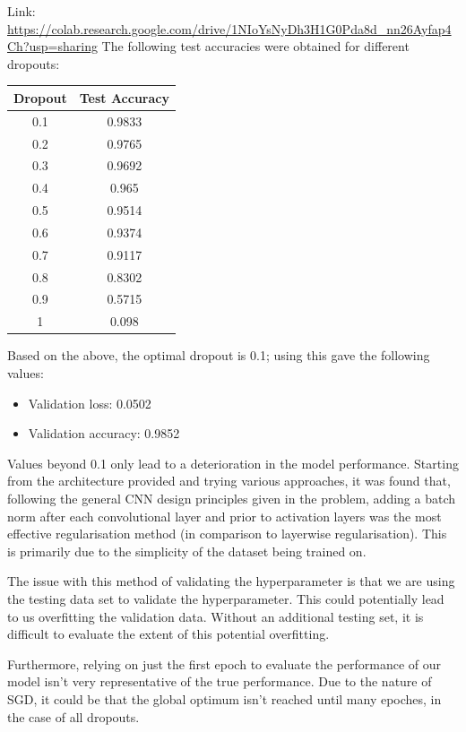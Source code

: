 \begin{solution}
  Link: \url{https://colab.research.google.com/drive/1NIoYsNyDh3H1G0Pda8d_nn26Ayfap4Ch?usp=sharing}
  The following test accuracies were obtained for different dropouts:

    \begin{center}
    \begin{tabular}{|c|c|}\hline
    Dropout & Test Accuracy \\\hline
    0.1     & 0.9833        \\
    0.2     & 0.9765        \\
    0.3     & 0.9692        \\
    0.4     & 0.965         \\
    0.5     & 0.9514        \\
    0.6     & 0.9374        \\
    0.7     & 0.9117        \\
    0.8     & 0.8302        \\
    0.9     & 0.5715        \\
    1       & 0.098        \\\hline
    \end{tabular}
  \end{center}
  Based on the above, the optimal dropout is 0.1; using this gave the following values:
  \begin{itemize}
    \item Validation loss: 0.0502
    \item Validation accuracy: 0.9852
  \end{itemize}
  Values beyond 0.1 only lead to a deterioration in the model performance. Starting from the architecture provided and trying various approaches, it was found that, following the general CNN design principles given in the problem, adding a batch norm after each convolutional layer and prior to activation layers was the most effective regularisation method (in comparison to layerwise regularisation). This is primarily due to the simplicity of the dataset being trained on.

  The issue with this method of validating the hyperparameter is that we are using the testing data set to validate the hyperparameter. This could potentially lead to us overfitting the validation data. Without an additional testing set, it is difficult to evaluate the extent of this potential overfitting. 

  Furthermore, relying on just the first epoch to evaluate the performance of our model isn't very representative of the true performance. Due to the nature of SGD, it could be that the global optimum isn't reached until many epoches, in the case of all dropouts.
\end{solution}



